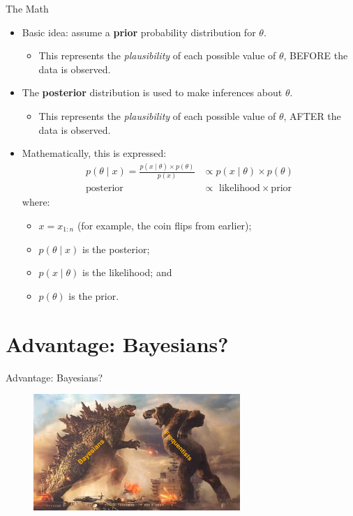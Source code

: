 \documentclass[dvipsnames,mathserif, handout]{beamer}
\begin{document}
{\begin{frame}{The Math}
	\begin{itemize}
		\item Basic idea: assume a \textbf{prior} probability distribution for $\theta$.
		\begin{itemize}
			\item \footnotesize This represents the \textit{plausibility} of each possible value of $\theta$, BEFORE the data is observed.
		\end{itemize}
		\item The \textbf{posterior} distribution is used to make inferences about $\theta$.
		\begin{itemize}
			\item \footnotesize This represents the \textit{plausibility} of each possible value of $\theta$, AFTER the data is observed.
		\end{itemize}
		\item Mathematically, this is expressed:
		\begin{align*}
			p(\theta \mid x) = \frac{p(x \mid \theta) \times p(\theta)}{p(x)} 	&\propto p(x \mid \theta) \times p(\theta)	\\
			\text{posterior~} \hspace{67pt} 							&\propto \text{~likelihood} \times \text{prior}
		\end{align*}
		where: 
		\begin{itemize} \footnotesize
			\item $x = x_{1:n}$ (for example, the coin flips from earlier); 
			\item $p( \theta \mid x)$ is the posterior; 
			\item $p(x \mid \theta)$ is the likelihood; and 
			\item $p(\theta)$ is the prior.
		\end{itemize}
	\end{itemize}
\end{frame}

\section{Advantage: Bayesians?}

\begin{frame}{Advantage: Bayesians?}
    \begin{figure}[!ht]
    	\includegraphics[height=125pt]{Godzilla_v_Kong.jpg}
    \end{figure}
    

\end{frame}}
\end{document}
